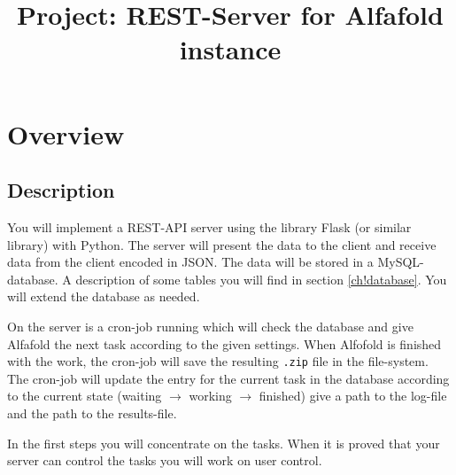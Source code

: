 \documentclass{article}
\begin{document}
\setlength{\parskip}{1em}
\setlength{\parindent}{0em}

\title{Project: REST-Server for Alfafold instance}
\section{Overview}

\subsection{Description}
You will implement a REST-API server using the library Flask (or similar library) with Python.
The server will present the data to the client and receive data from the client encoded in JSON.
The data will be stored in a MySQL-database. A description of some tables you will find in section \ref{ch!database}. You will extend the database as needed.

On the server is a cron-job running which will check the database and give
Alfafold the next task according to the given settings. When Alfofold is
finished with the work, the cron-job will save the resulting \texttt{.zip}
file in the file-system. The cron-job will update the entry for the current
task in the database according to the current state (waiting $\to$ working $\to$ finished) give a path to the log-file and the path to the results-file.

In the first steps you will concentrate on the tasks.
When it is proved that your server can control the tasks you will work on user control.
\end{document}
